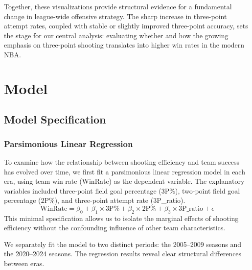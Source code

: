 \documentclass[11pt, a4paper]{article} %
\begin{document}
Together, these visualizations provide structural evidence for a fundamental change in league-wide offensive strategy. 
The sharp increase in three-point attempt rates, coupled with stable or slightly improved three-point accuracy, sets the stage for our 
central analysis: evaluating whether and how the growing emphasis on three-point shooting translates into higher win rates in the modern NBA.



\section{Model}
\subsection{Model Specification}
\subsubsection{Parsimonious Linear Regression}
To examine how the relationship between shooting efficiency and team success has evolved over time, we first fit a parsimonious linear 
regression model in each era, using team win rate (WinRate) as the dependent variable. The explanatory variables included three-point 
field goal percentage (3P\%), two-point field goal percentage (2P\%), and three-point attempt rate (3P\_ratio). 
\[
\text{WinRate} = \beta_0 + \beta_1 \times \text{3P\%} + \beta_2 \times \text{2P\%} + \beta_3 \times \text{3P\_ratio} + \epsilon
\]
This minimal specification 
allows us to isolate the marginal effects of shooting efficiency without the confounding influence of other team characteristics.

We separately fit the model to two distinct periods: the 2005--2009 seasons and the 2020--2024 seasons. The regression results reveal 
clear structural differences between eras.
\end{document}
